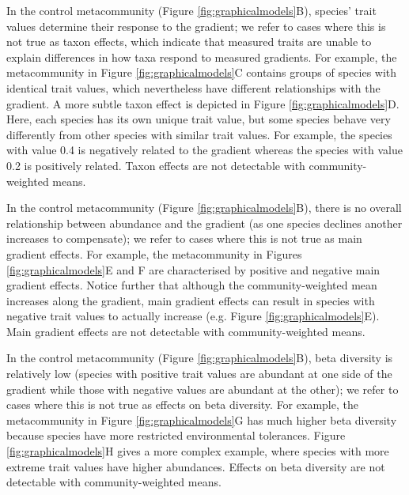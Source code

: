 \documentclass[12pt]{ecology}
\begin{document}
In the control metacommunity (Figure \ref{fig:graphicalmodels}B), species' trait values determine their response to the gradient; we refer to cases where this is not true as taxon effects, which indicate that measured traits are unable to explain differences in how taxa respond to measured gradients.  For example, the metacommunity in Figure \ref{fig:graphicalmodels}C contains groups of species with identical trait values, which nevertheless have different relationships with the gradient.  A more subtle taxon effect is depicted in Figure \ref{fig:graphicalmodels}D.  Here, each species has its own unique trait value, but some species behave very differently from other species with similar trait values.  For example, the species with value 0.4 is negatively related to the gradient whereas the species with value 0.2 is positively related.  Taxon effects are not detectable with community-weighted means.

In the control metacommunity (Figure \ref{fig:graphicalmodels}B), there is no overall relationship between abundance and the gradient (as one species declines another increases to compensate); we refer to cases where this is not true as main gradient effects.  For example, the metacommunity in Figures \ref{fig:graphicalmodels}E and F are characterised by positive and negative main gradient effects.  Notice further that although the community-weighted mean increases along the gradient, main gradient effects can result in species with negative trait values to actually increase (e.g. Figure \ref{fig:graphicalmodels}E).  Main gradient effects are not detectable with community-weighted means.

In the control metacommunity (Figure \ref{fig:graphicalmodels}B), beta diversity is relatively low (species with positive trait values are abundant at one side of the gradient while those with negative values are abundant at the other); we refer to cases where this is not true as effects on beta diversity.  For example, the metacommunity in Figure \ref{fig:graphicalmodels}G has much higher beta diversity because species have more restricted environmental tolerances.  Figure \ref{fig:graphicalmodels}H gives a more complex example, where species with more extreme trait values have higher abundances.  Effects on beta diversity are not detectable with community-weighted means.
\end{document}
